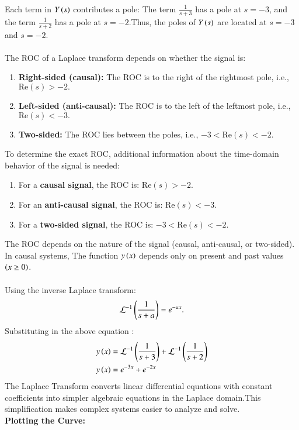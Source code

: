 \documentclass[journal,12pt,onecolumn]{IEEEtran}
\theoremstyle{remark}
\begin{document}
Each term in $Y\left(s\right)$ contributes a pole:
The term $\frac{1}{s+3}$ has a pole at $s = -3$, and the term $\frac{1}{s+2}$ has a pole at $s = -2$.Thus, the poles of $Y\left(s\right)$ are located at $s = -3$ and $s = -2$.\\\\
The ROC of a Laplace transform depends on whether the signal is:
\begin{enumerate}
    \item \textbf{Right-sided (causal):} The ROC is to the right of the rightmost pole, i.e., $ \text{Re}(s) > -2 .$
    \item \textbf{Left-sided (anti-causal):} The ROC is to the left of the leftmost pole, i.e., $ \text{Re}(s) < -3 .$
    \item \textbf{Two-sided:} The ROC lies between the poles, i.e., $-3 < \text{Re}(s) < -2 .$
\end{enumerate}
To determine the exact ROC, additional information about the time-domain behavior of the signal is needed:
\begin{enumerate}
    \item For a \textbf{causal signal}, the ROC is:
    $ \text{Re}(s) > -2. $
    \item For an \textbf{anti-causal signal}, the ROC is:
    $\text{Re}(s) < -3. $
    \item For a \textbf{two-sided signal}, the ROC is:
    $ -3 < \text{Re}(s) < -2. $
\end{enumerate}
The ROC depends on the nature of the signal (causal, anti-causal, or two-sided).\\
In causal systems, The function $y\left(x\right)$ depends only on present and past values $\left(x\geq0\right)$.
\\\\Using the inverse Laplace transform:
\begin{align}
    \mathcal{L}^{-1}\left(\frac{1}{s + a}\right) = e^{-ax}.
\end{align}
Substituting in the above equation  :
\begin{align}
y\left(x\right) &= \mathcal{L}^{-1}\left(\frac{1}{s + 3}\right) + \mathcal{L}^{-1}\left(\frac{1}{s + 2}\right)\\
y\left(x\right) &= e^{-3x} + e^{-2x}
\end{align}
The Laplace Transform converts linear differential equations with constant coefficients into simpler algebraic equations in the Laplace domain.This simplification makes complex systems easier to analyze and solve.\\
\textbf{Plotting the Curve:}
\end{document}
